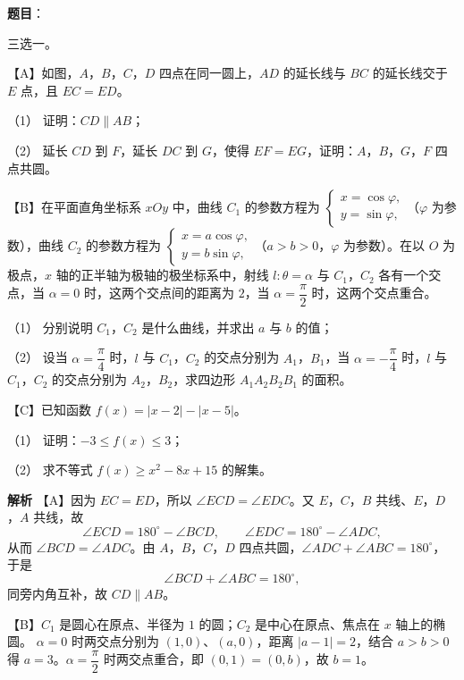 \begin{answer}

\textbf{题目}：

三选一。

【A】如图，$A$，$B$，$C$，$D$ 四点在同一圆上，$AD$ 的延长线与 $BC$ 的延长线交于 $E$ 点，且 $EC=ED$。

（1） 证明：$CD\parallel AB$；

（2） 延长 $CD$ 到 $F$，延长 $DC$ 到 $G$，使得 $EF=EG$，证明：$A$，$B$，$G$，$F$ 四点共圆。
\nopagebreak[4]
\begin{center}\end{center}
\nopagebreak[4]
【B】在平面直角坐标系 $xOy$ 中，曲线 $C_1$ 的参数方程为 $\begin{cases}x=\cos\varphi,\\y=\sin\varphi,\end{cases}$（$\varphi$ 为参数），曲线 $C_2$ 的参数方程为 $\begin{cases}x=a\cos\varphi,\\y=b\sin\varphi,\end{cases}$（$a>b>0$，$\varphi$ 为参数）。在以 $O$ 为极点，$x$ 轴的正半轴为极轴的极坐标系中，射线 $l:\theta=\alpha$ 与 $C_1$，$C_2$ 各有一个交点，当 $\alpha=0$ 时，这两个交点间的距离为 $2$，当 $\alpha=\dfrac\pi2$ 时，这两个交点重合。

（1） 分别说明 $C_1$，$C_2$ 是什么曲线，并求出 $a$ 与 $b$ 的值；

（2） 设当 $\alpha=\dfrac\pi4$ 时，$l$ 与 $C_1$，$C_2$ 的交点分别为 $A_1$，$B_1$，当 $\alpha=-\dfrac\pi4$ 时，$l$ 与 $C_1$，$C_2$ 的交点分别为 $A_2$，$B_2$，求四边形 $A_1A_2B_2B_1$ 的面积。

【C】已知函数 $f(x)=|x-2|-|x-5|$。

（1） 证明：$-3\leqslant f(x)\leqslant3$；

（2） 求不等式 $f(x)\geqslant x^2-8x+15$ 的解集。

\textbf{解析}
【A】因为 $EC=ED$，所以 $\angle ECD=\angle EDC$。又 $E$，$C$，$B$ 共线、$E$，$D$，$A$ 共线，故
\nopagebreak[4]
\[\angle ECD=180^\circ-\angle BCD,\qquad \angle EDC=180^\circ-\angle ADC,\]
从而 $\angle BCD=\angle ADC$。由 $A$，$B$，$C$，$D$ 四点共圆，$\angle ADC+\angle ABC=180^\circ$，于是
\nopagebreak[4]
\[\angle BCD+\angle ABC=180^\circ,\]
同旁内角互补，故 $CD\parallel AB$。

【B】$C_1$ 是圆心在原点、半径为 $1$ 的圆；$C_2$ 是中心在原点、焦点在 $x$ 轴上的椭圆。
$\alpha=0$ 时两交点分别为 $(1,0)$、$(a,0)$，距离 $|a-1|=2$，结合 $a>b>0$ 得 $a=3$。$\alpha=\dfrac\pi2$ 时两交点重合，即 $(0,1)=(0,b)$，故 $b=1$。


\end{answer}
